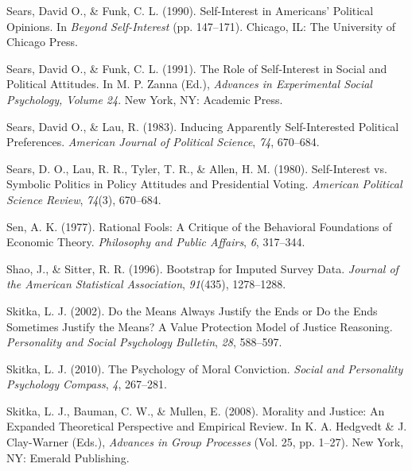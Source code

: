 \documentclass[12pt,econ]{sources/authesis}
\newenvironment{CSLReferences}%
  {}%
  {\par}
\begin{document}
\begin{CSLReferences}{1}{0}
\leavevmode{}%
Sears, David O., \& Funk, C. L. (1990). Self-{Interest} in {Americans}' {Political} {Opinions}. In \emph{Beyond {Self}-{Interest}} (pp. 147--171). Chicago, IL: The University of Chicago Press.

\leavevmode{}%
Sears, David O., \& Funk, C. L. (1991). The {Role} of {Self}-{Interest} in {Social} and {Political} {Attitudes}. In M. P. Zanna (Ed.), \emph{Advances in {Experimental} {Social} {Psychology}, {Volume} 24}. New York, NY: Academic Press.

\leavevmode{}%
Sears, David O., \& Lau, R. (1983). Inducing {Apparently} {Self}-{Interested} {Political} {Preferences}. \emph{American Journal of Political Science}, \emph{74}, 670--684.

\leavevmode{}%
Sears, D. O., Lau, R. R., Tyler, T. R., \& Allen, H. M. (1980). Self-{Interest} vs. {Symbolic} {Politics} in {Policy} {Attitudes} and {Presidential} {Voting}. \emph{American Political Science Review}, \emph{74}(3), 670--684.

\leavevmode{}%
Sen, A. K. (1977). Rational {Fools}: {A} {Critique} of the {Behavioral} {Foundations} of {Economic} {Theory}. \emph{Philosophy and Public Affairs}, \emph{6}, 317--344.

\leavevmode{}%
Shao, J., \& Sitter, R. R. (1996). {Bootstrap for Imputed Survey Data}. \emph{Journal of the American Statistical Association}, \emph{91}(435), 1278--1288.

\leavevmode{}%
Skitka, L. J. (2002). {Do the Means Always Justify the Ends or Do the Ends Sometimes Justify the Means? A Value Protection Model of Justice Reasoning}. \emph{Personality and Social Psychology Bulletin}, \emph{28}, 588--597.

\leavevmode{}%
Skitka, L. J. (2010). The {Psychology} of {Moral} {Conviction}. \emph{Social and Personality Psychology Compass}, \emph{4}, 267--281.

\leavevmode{}%
Skitka, L. J., Bauman, C. W., \& Mullen, E. (2008). {Morality and Justice: An Expanded Theoretical Perspective and Empirical Review}. In K. A. Hedgvedt \& J. Clay-Warner (Eds.), \emph{{Advances in Group Processes}} (Vol. 25, pp. 1--27). New York, NY: Emerald Publishing.


\end{CSLReferences}
\end{document}
